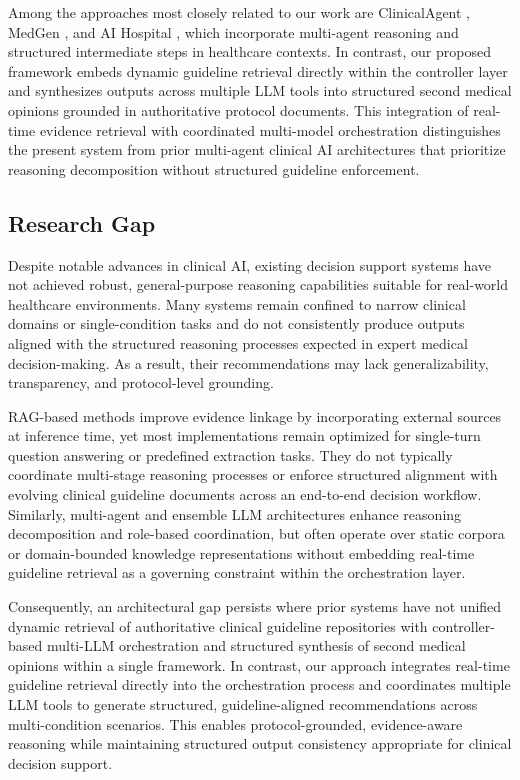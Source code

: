 \documentclass[preprint,12pt]{elsarticle}
\begin{document}
Among the approaches most closely related to our work are ClinicalAgent \cite{r20}, MedGen \cite{r22}, and AI Hospital \cite{r21}, which incorporate multi-agent reasoning and structured intermediate steps in healthcare contexts. In contrast, our proposed framework embeds dynamic guideline retrieval directly within the controller layer and synthesizes outputs across multiple LLM tools into structured second medical opinions grounded in authoritative protocol documents. This integration of real-time evidence retrieval with coordinated multi-model orchestration distinguishes the present system from prior multi-agent clinical AI architectures that prioritize reasoning decomposition without structured guideline enforcement.

\subsection{Research Gap}

Despite notable advances in clinical AI, existing decision support systems have not achieved robust, general-purpose reasoning capabilities suitable for real-world healthcare environments. Many systems remain confined to narrow clinical domains or single-condition tasks and do not consistently produce outputs aligned with the structured reasoning processes expected in expert medical decision-making. As a result, their recommendations may lack generalizability, transparency, and protocol-level grounding.

RAG-based methods improve evidence linkage by incorporating external sources at inference time, yet most implementations remain optimized for single-turn question answering or predefined extraction tasks. They do not typically coordinate multi-stage reasoning processes or enforce structured alignment with evolving clinical guideline documents across an end-to-end decision workflow. Similarly, multi-agent and ensemble LLM architectures enhance reasoning decomposition and role-based coordination, but often operate over static corpora or domain-bounded knowledge representations without embedding real-time guideline retrieval as a governing constraint within the orchestration layer.

Consequently, an architectural gap persists where prior systems have not unified dynamic retrieval of authoritative clinical guideline repositories with controller-based multi-LLM orchestration and structured synthesis of second medical opinions within a single framework. In contrast, our approach integrates real-time guideline retrieval directly into the orchestration process and coordinates multiple LLM tools to generate structured, guideline-aligned recommendations across multi-condition scenarios. This enables protocol-grounded, evidence-aware reasoning while maintaining structured output consistency appropriate for clinical decision support.
\end{document}
